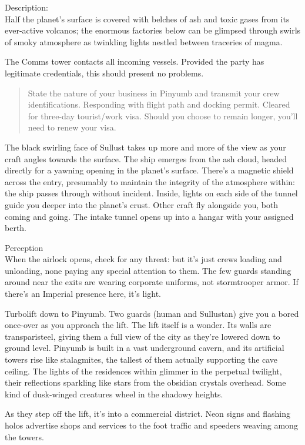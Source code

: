 \documentclass{book}
\begin{document}
Description:\\
Half the planet’s surface is covered with belches of ash and toxic gases from its ever-active volcanos; the enormous factories below can be glimpsed through swirls of smoky atmosphere as twinkling lights nestled between traceries of magma.

The Comms tower contacts all incoming vessels.  Provided the party has legitimate credentials, this should present no problems.

\begin{quote}
State the nature of your business in Pinyumb and transmit your crew identifications.
Responding with flight path and docking permit.
Cleared for three-day tourist/work visa. 
Should you choose to remain longer, you’ll need to renew your visa.
\end{quote}

The black swirling face of Sullust takes up more and more of the view as your craft angles towards the surface. The ship emerges from the ash cloud, headed directly for a yawning opening in the planet’s surface. There’s a magnetic shield across the entry, presumably to maintain the integrity of the atmosphere within: the ship passes through without incident. Inside, lights on each side of the tunnel guide you deeper into the planet’s crust. Other craft fly alongside you, both coming and going. The intake tunnel opens up into a hangar with your assigned berth.

\difficulty \difficulty Perception \\
When the airlock opens, check for any threat: but it’s just crews loading and unloading, none paying any special attention to them. The few guards standing around near the exits are wearing corporate uniforms, not stormtrooper armor. If there’s an Imperial presence here, it’s light.

Turbolift down to Pinyumb. Two guards (human and Sullustan) give you a bored once-over as you approach the lift. The lift itself is a wonder. Its walls are transparisteel, giving them a full view of the city as they’re lowered down to ground level. Pinyumb is built in a vast underground cavern, and its artificial towers rise like stalagmites, the tallest of them actually supporting the cave ceiling. The lights of the residences within glimmer in the perpetual twilight, their reflections sparkling like stars from the obsidian crystals overhead. Some kind of dusk-winged creatures wheel in the shadowy heights.

As they step off the lift, it’s into a commercial district. Neon signs and flashing holos advertise shops and services to the foot traffic and speeders weaving among the towers.
\end{document}
